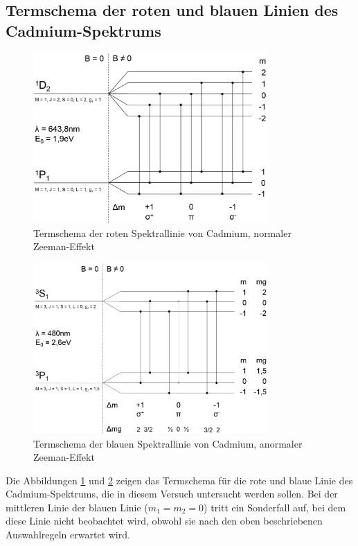 \subsection{Termschema der roten und blauen Linien des Cadmium-Spektrums}
\begin{figure}
	\centering
	\includegraphics[width=0.8\textwidth]{img/rot}
	\caption{Termschema der roten Spektrallinie von Cadmium, normaler Zeeman-Effekt}
	\label{fig:rot}
\end{figure}
\begin{figure}
	\centering
	\includegraphics[width=0.8\textwidth]{img/blau}
	\caption{Termschema der blauen Spektrallinie von Cadmium, anormaler Zeeman-Effekt}
	\label{fig:blau}
\end{figure}

Die Abbildungen \ref{fig:rot} und \ref{fig:blau} zeigen das Termschema für die rote und blaue Linie des Cadmium-Spektrums, die in diesem Versuch untersucht werden sollen.
Bei der mittleren Linie der blauen Linie ($m_1 = m_2 = 0$) tritt ein Sonderfall auf, bei dem diese Linie nicht beobachtet wird, obwohl sie nach den oben beschriebenen Auswahlregeln erwartet wird.

